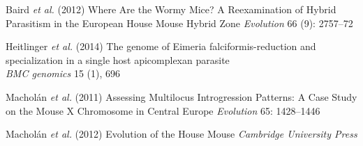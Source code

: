 \documentclass[30pt, a0paper, portrait, margin=0mm, innermargin=15mm,
               blockverticalspace=15mm, colspace=15mm, subcolspace=8mm]{tikzposter}
\begin{document}
\begin{columns}

      {
        \begin{small}
          
          \hangindent=2cm Baird \textit{et al.} (2012) Where Are the Wormy Mice? A Reexamination of Hybrid Parasitism in the European House Mouse Hybrid Zone \textit{Evolution} 66 (9): 2757--72
           
          \hangindent=2cm Heitlinger \textit{et al.} (2014) The genome of Eimeria falciformis-reduction and specialization in a single host apicomplexan parasite \\ \textit{BMC genomics} 15 (1), 696
          
          \hangindent=2cm Machol\'{a}n \textit{et al.} (2011) Assessing Multilocus Introgression Patterns: A Case Study on the Mouse X Chromosome in Central Europe \textit{Evolution} 65: 1428--1446

          \hangindent=2cm Machol\'{a}n \textit{et al.} (2012) Evolution of the House Mouse
          \textit{Cambridge University Press}
          
        
          
        \end{small}
      }

\end{columns}

\end{document}
